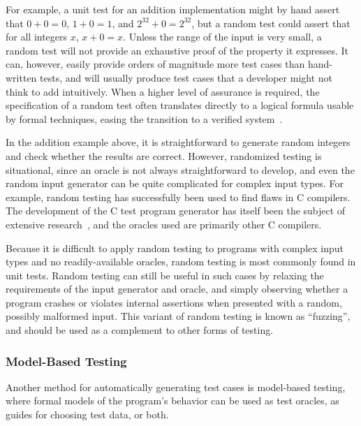 For example, a unit test for an addition implementation might by hand
assert that $0+0=0$, $1+0=1$, and $2^{32}+0=2^{32}$, but a random test
could assert that for all integers $x$, $x+0=x$. Unless the range of
the input is very small, a random test will not provide an exhaustive
proof of the property it expresses. It can, however, easily provide
orders of magnitude more test cases than hand-written tests, and will
usually produce test cases that a developer might not think to add
intuitively. When a higher level of assurance is required, the
specification of a random test often translates directly to a logical
formula usable by formal techniques, easing the transition to a
verified system~\cite{swierstra2012xmonad}.

In the addition example above, it is straightforward to generate
random integers and check whether the results are correct. However,
randomized testing is situational, since an oracle is not always
straightforward to develop, and even the random input generator can be
quite complicated for complex input types. For example, random testing
has successfully been used to find flaws in C compilers. The
development of the C test program generator has itself been the
subject of extensive research~\cite{yang2011finding}, and the oracles
used are primarily other C compilers.

Because it is difficult to apply random testing to programs with
complex input types and no readily-available oracles, random testing
is most commonly found in unit tests. Random testing can still be
useful in such cases by relaxing the requirements of the input
generator and oracle, and simply observing whether a program crashes
or violates internal assertions when presented with a random, possibly
malformed input. This variant of random testing is known as
``fuzzing'', and should be used as a complement to other forms of
testing.

\subsubsection{Model-Based Testing}

Another method for automatically generating test cases is model-based
testing, where formal models of the program's behavior can be used as
test oracles, as guides for choosing test data, or both.

